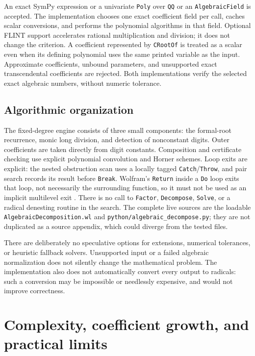 \documentclass[11pt,a4paper]{article}
\numberwithin{equation}{section}
\theoremstyle{definition}
\theoremstyle{remark}
\newcommand{\code}[1]{\texttt{#1}}
\begin{document}
An exact SymPy expression or a univariate \code{Poly} over \code{QQ} or an
\code{AlgebraicField} is accepted. The implementation chooses one exact
coefficient field per call, caches scalar conversions, and performs the
polynomial algorithms in that field. Optional FLINT support accelerates
rational multiplication and division; it does not change the criterion.
A coefficient represented by \code{CRootOf} is treated as a scalar even
when its defining polynomial uses the same printed variable as the input.
Approximate coefficients, unbound parameters, and unsupported exact
transcendental coefficients are rejected. Both implementations verify the
selected exact algebraic numbers, without numeric tolerance.

\subsection{Algorithmic organization}
The fixed-degree engine consists of three small components: the formal-root
recurrence, monic long division, and detection of nonconstant digits. Outer
coefficients are taken directly from digit constants. Composition and
certificate checking use explicit polynomial convolution and Horner schemes.
Loop exits are explicit: the nested obstruction scan uses a locally tagged
\code{Catch}/\code{Throw}, and pair search records its result before
\code{Break}. Wolfram's \code{Return} inside a \code{Do} loop exits that loop,
not necessarily the surrounding function, so it must not be used as an
implicit multilevel exit \cite{Return}.
There is no call to \code{Factor}, \code{Decompose}, \code{Solve}, or a radical
denesting routine in the search. The complete live sources are the loadable
\code{AlgebraicDecomposition.wl} and
\code{python/algebraic\_decompose.py}; they are not duplicated as a source appendix,
which could diverge from the tested files.

There are deliberately no speculative options for extensions, numerical
tolerances, or heuristic fallback solvers. Unsupported input or a failed
algebraic normalization does not silently change the mathematical problem.
The implementation also does not automatically convert every output to
radicals: such a conversion may be impossible or needlessly expensive, and
would not improve correctness.

\section{Complexity, coefficient growth, and practical limits}
\label{sec:complexity}
\end{document}
